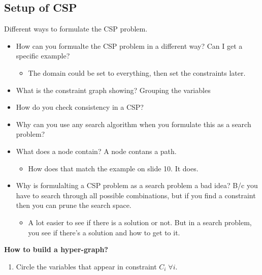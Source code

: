 \subsection{Setup of CSP}
\begin{example}
    Different ways to formulate the CSP problem. 
    \begin{itemize}
        \item How can you formualte the CSP problem in a different way? Can I get a specific example?
        \begin{itemize}
            \item The domain could be set to everything, then set the constraints later.
        \end{itemize}
        \item What is the constraint graph showing? Grouping the variables
        \item How do you check consistency in a CSP?
        \item Why can you use any search algorithm when you formulate this as a search problem? 
        \item What does a node contain? A node contans a path. 
        \begin{itemize}
            \item How does that match the example on slide 10. It does. 
        \end{itemize}
        \item Why is formulalting a CSP problem as a search problem a bad idea? B/c you have to search through all possible combinations, but if you find a constraint then you can prune the search space.
        \begin{itemize}
            \item A lot easier to see if there is a solution or not. But in a search problem, you see if there's a solution and how to get to it. 
        \end{itemize}
    \end{itemize}
\end{example}

\begin{example}
\end{example}
\newpage

\begin{process} \textbf{How to build a hyper-graph?}
    \begin{enumerate}
        \item Circle the variables that appear in constraint $C_i \; \forall i$.
    \end{enumerate}
\end{process}

